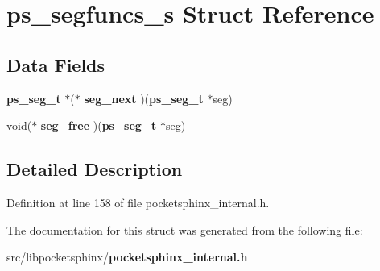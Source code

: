 \section{ps\+\_\+segfuncs\+\_\+s Struct Reference}
\label{structps__segfuncs__s}
\subsection*{Data Fields}
\begin{DoxyCompactItemize}
\item 
{\bf ps\+\_\+seg\+\_\+t} $\ast$($\ast$ {\bfseries seg\+\_\+next} )({\bf ps\+\_\+seg\+\_\+t} $\ast$seg)\label{structps__segfuncs__s_a880757cdcfb8c858dfa82d44259fc8f9}

\item 
void($\ast$ {\bfseries seg\+\_\+free} )({\bf ps\+\_\+seg\+\_\+t} $\ast$seg)\label{structps__segfuncs__s_aefbd109d77bf6556b352e5fab721858e}

\end{DoxyCompactItemize}


\subsection{Detailed Description}


Definition at line 158 of file pocketsphinx\+\_\+internal.\+h.



The documentation for this struct was generated from the following file\+:\begin{DoxyCompactItemize}
\item 
src/libpocketsphinx/{\bf pocketsphinx\+\_\+internal.\+h}\end{DoxyCompactItemize}

